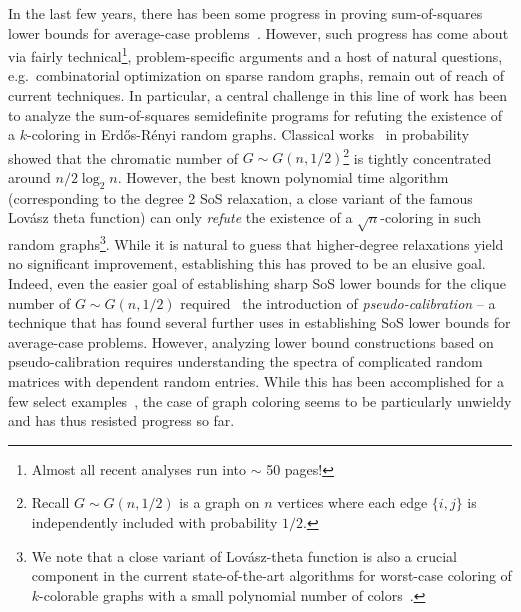 \documentclass[10pt,a4paper]{article}
\theoremstyle{definition}
\newcommand{\Erdos}{Erd\H{o}s\xspace}
\newcommand{\Renyi}{R\'enyi\xspace}
\newcommand{\Lovasz}{Lov\'asz\xspace}
\newcommand{\numcolors}{k}
\begin{document}
In the last few years, there has been some progress in proving sum-of-squares lower bounds for average-case problems~\cite{MR1880908-Grigoriev01,MR1875740-Grigoriev02,DBLP:conf/focs/Schoenebeck08,MR2780076-Tulsiani09,MR3388187-Barak15,DBLP:conf/focs/BarakHKKMP16,DBLP:conf/stoc/KothariMOW17,ghosh2020sumofsquares,10.1145/3357713.3384319}. However, such progress has come about via fairly technical\footnote{Almost all recent analyses run into $\sim$ 50 pages!}, problem-specific arguments and a host of natural questions, e.g.\ combinatorial optimization on sparse random graphs, remain out of reach of current techniques. In particular, a central challenge in this line of work has been to analyze the sum-of-squares semidefinite programs for refuting the existence of a $\numcolors$-coloring in \Erdos-\Renyi random graphs. Classical works~\cite{MR951992} in probability showed that the chromatic number of $G \sim G(n,1/2)$\footnote{Recall $G \sim G(n,1/2)$ is a graph on $n$ vertices where each edge $\{i,j\}$ is independently included with probability $1/2$.} is tightly concentrated around $n/2 \log_2 n$. However, the best known polynomial time algorithm (corresponding to the degree 2 SoS relaxation, a close variant of the famous \Lovasz theta function) can only \emph{refute} the existence of a $\sqrt{n}$-coloring in such random graphs\footnote{We note that a close variant of \Lovasz-theta function is also a crucial component in the current state-of-the-art algorithms for worst-case coloring of $k$-colorable graphs with a small polynomial number of colors~\cite{DBLP:journals/jacm/KargerMS98,MR2277147-Arora06,DBLP:conf/focs/Chlamtac07}.}. While it is natural to guess that higher-degree relaxations yield no significant improvement, establishing this has proved to be an elusive goal. Indeed, even the easier goal of establishing sharp SoS lower bounds for the clique number of $G \sim G(n,1/2)$ required~\cite{DBLP:conf/focs/BarakHKKMP16} the introduction of \emph{pseudo-calibration} -- a technique that has found several further uses in establishing SoS lower bounds for average-case problems. However, analyzing lower bound constructions based on pseudo-calibration requires understanding the spectra of complicated random matrices with dependent random entries. While this has been accomplished for a few select examples~\cite{8104104,ghosh2020sumofsquares}, the case of graph coloring seems to be particularly unwieldy and has thus resisted progress so far. 
\end{document}
